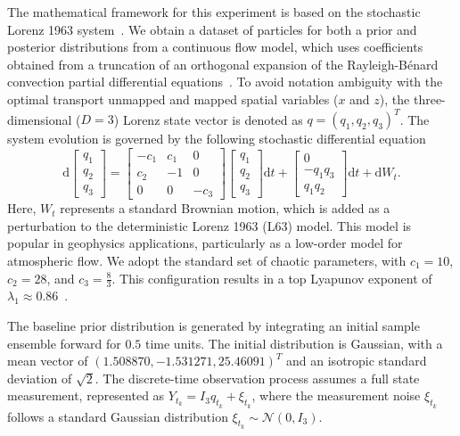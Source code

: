The mathematical framework for this experiment is based on the stochastic Lorenz 1963 system~\cite{lorenz1963deterministic}. We obtain a dataset of particles for both a prior and posterior distributions from a continuous flow model, which uses coefficients obtained from a truncation of an orthogonal expansion of the Rayleigh-Bénard convection partial differential equations~\cite{beeson2024bayesflow}. To avoid notation ambiguity with the optimal transport unmapped and mapped spatial variables ($x$ and $z$), the three-dimensional ($D=3$) Lorenz state vector is denoted as $q = (q_1, q_2, q_3)^T$. The system evolution is governed by the following stochastic differential equation
\begin{equation*} \label{eq:lorenz_63_sde}
    \mathrm{d}\begin{bmatrix}q_1\\ q_2\\ q_3\end{bmatrix} = \begin{bmatrix}-c_1 & c_1 & 0\\ c_2 & -1 & 0\\ 0 & 0 & -c_3\end{bmatrix}\begin{bmatrix}q_1\\ q_2\\ q_3\end{bmatrix}\mathrm{d}t + \begin{bmatrix}0\\ -q_1 q_3\\ q_1 q_2\end{bmatrix}\mathrm{d}t + \mathrm{d}W_t.
\end{equation*}
Here, $W_t$ represents a standard Brownian motion, which is added as a perturbation to the deterministic Lorenz 1963 (L63) model. This model is popular in geophysics applications, particularly as a low-order model for atmospheric flow. We adopt the standard set of chaotic parameters, with $c_1 = 10$, $c_2 = 28$, and $c_3 = \frac{8}{3}$. This configuration results in a top Lyapunov exponent of $\lambda_1 \approx 0.86$~\cite{beeson2024bayesflow}.

The baseline prior distribution is generated by integrating an initial sample ensemble forward for $0.5$ time units. The initial distribution is Gaussian, with a mean vector of $(1.508870, -1.531271, 25.46091)^T$ and an isotropic standard deviation of $\sqrt{2}$. The discrete-time observation process assumes a full state measurement, represented as $Y_{t_k} = I_{3} q_{t_k} + \xi_{t_k}$, where the measurement noise $\xi_{t_k}$ follows a standard Gaussian distribution $\xi_{t_k} \sim \mathcal{N}(0, I_{3})$.


